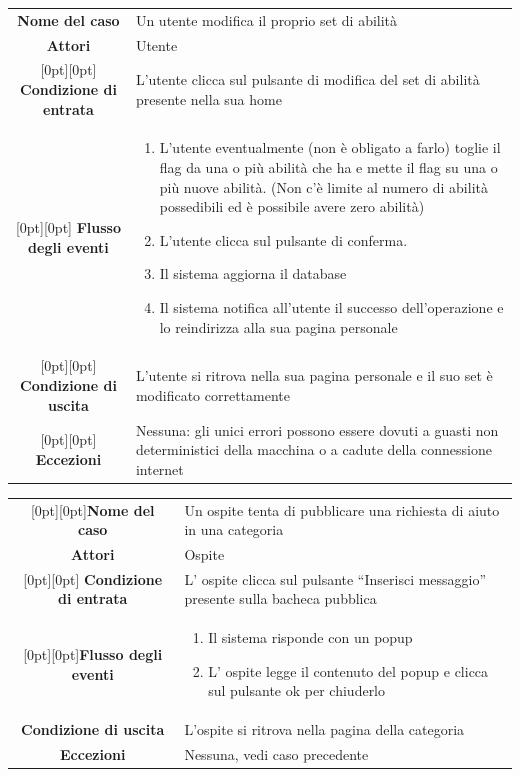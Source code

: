 \documentclass[a4paper,12pt]{article}
\begin{document}
\begin{tabularx}{\textwidth}{|c|X|}
\rowcolor[gray]{.9}\hline  \textbf{Nome del caso} & Un utente modifica il proprio set di abilità \\
\rowcolor[gray]{.9}\hline  \textbf{Attori} & Utente \\ 
\rowcolor[gray]{.9}\hline \raisebox{-1ex}[0pt][0pt]{ \textbf{Condizione di entrata}} & L'utente clicca sul pulsante di modifica del set di abilità presente nella sua home \\
\rowcolor[gray]{.9}\hline \raisebox{-11ex}[0pt][0pt]{ \textbf{Flusso degli eventi}} & 
\begin{enumerate}
\itemsep0em 
\item L'utente eventualmente (non è obligato a farlo) toglie il flag da una o più abilità che ha e mette il flag su una o più nuove abilità. (Non c'è limite al numero di abilità possedibili ed è possibile avere zero abilità)
\item L'utente clicca sul pulsante di conferma.
\item Il sistema aggiorna il database
\item Il sistema notifica all'utente il successo dell'operazione e lo reindirizza alla sua pagina personale
\end{enumerate}
 \\ 
\rowcolor[gray]{.9}\hline \raisebox{-1ex}[0pt][0pt]{ \textbf{Condizione di uscita}} & L'utente si ritrova nella sua pagina personale e il suo set è modificato correttamente \\
\rowcolor[gray]{.9}\hline \raisebox{-2ex}[0pt][0pt]{ \textbf{Eccezioni}} & Nessuna: gli unici errori possono essere dovuti a guasti non deterministici della macchina o a cadute della connessione internet
\\
\hline 
\end{tabularx} \clearpage
\begin{tabularx}{\textwidth}{|c|X|}
\rowcolor[gray]{.9}\hline  \raisebox{-1ex}[0pt][0pt]{\textbf{Nome del caso}} & Un ospite tenta di pubblicare una richiesta di aiuto in una categoria\\
\rowcolor[gray]{.9}\hline  \textbf{Attori} & Ospite \\ 
\rowcolor[gray]{.9}\hline \raisebox{-1ex}[0pt][0pt]{ \textbf{Condizione di entrata}} & L' ospite clicca sul pulsante “Inserisci messaggio” presente sulla bacheca pubblica \\
\rowcolor[gray]{.9}\hline  \raisebox{-5.5ex}[0pt][0pt]{\textbf{Flusso degli eventi}} & 
\begin{enumerate}
\itemsep0em 
\item Il sistema risponde con un popup
\item L' ospite legge il contenuto del popup e clicca sul pulsante ok per chiuderlo
\end{enumerate}
 \\ 
\rowcolor[gray]{.9}\hline \textbf{Condizione di uscita} & L'ospite si ritrova nella pagina della categoria \\
\rowcolor[gray]{.9}\hline \textbf{Eccezioni} & Nessuna, vedi caso precedente
\\
\hline 
\end{tabularx} \\[3\baselineskip]
\end{document}
